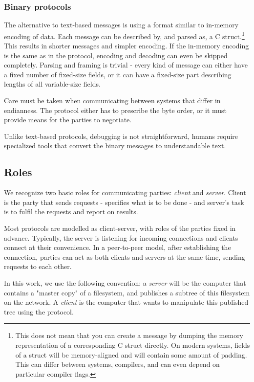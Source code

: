 \subsubsection{Binary protocols}

The alternative to text-based messages is using a format similar to in-memory encoding of data. Each message
can be described by, and parsed as, a C struct.\footnote{This does not mean that you can create a message by
dumping the memory representation of a corresponding C struct directly. On modern systems, fields of a struct
will be memory-aligned and will contain some amount of padding. This can differ between systems, compilers,
and can even depend on particular compiler flags.} This results in shorter messages and simpler encoding. If
the in-memory encoding is the same as in the protocol, encoding and decoding can even be skipped completely.
Parsing and framing is trivial - every kind of message can either have a fixed number of fixed-size fields, or
it can have a fixed-size part describing lengths of all variable-size fields.

Care must be taken when communicating between systems that differ in endianness.  The protocol either has to
prescribe the byte order, or it must provide means for the parties to negotiate.

Unlike text-based protocols, debugging is not straightforward, humans require specialized tools that convert
the binary messages to understandable text.


\subsection{Roles}

We recognize two basic roles for communicating parties: {\it client} and {\it server}. Client is the party
that sends requests - specifies what is to be done - and server's task is to fulfil the requests and report on
results.

Most protocols are modelled as client-server, with roles of the parties fixed in advance. Typically, the
server is listening for incoming connections and clients connect at their convenience. In a peer-to-peer
model, after establishing the connection, parties can act as both clients and servers at the same time,
sending requests to each other.

In this work, we use the following convention: a {\it server} will be the computer that contains a "master
copy" of a filesystem, and publishes a subtree of this filesystem on the network. A {\it client} is the
computer that wants to manipulate this published tree using the protocol.


